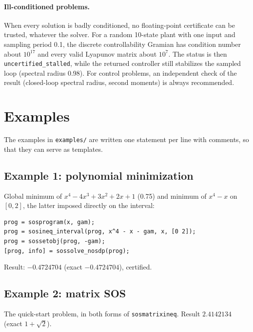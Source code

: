 \documentclass[11pt,a4paper]{article}
\newcommand{\code}[1]{\texttt{#1}}
\begin{document}
\paragraph{Ill-conditioned problems.} When every solution is badly conditioned, no floating-point certificate can be trusted, whatever the solver. For a random 10-state plant with one input and sampling period 0.1, the discrete controllability Gramian has condition number about $10^{17}$ and every valid Lyapunov matrix about $10^{7}$. The status is then \code{uncertified\_stalled}, while the returned controller still stabilizes the sampled loop (spectral radius 0.98). For control problems, an independent check of the result (closed-loop spectral radius, second moments) is always recommended.

\section{Examples}\label{sec:examples}
The examples in \code{examples/} are written one statement per line with comments, so that they can serve as templates.

\subsection{Example 1: polynomial minimization}
Global minimum of $x^4-4x^3+3x^2+2x+1$ (0.75) and minimum of $x^4-x$ on $[0,2]$, the latter imposed directly on the interval:
\begin{lstlisting}
prog = sosprogram(x, gam);
prog = sosineq_interval(prog, x^4 - x - gam, x, [0 2]);
prog = sossetobj(prog, -gam);
[prog, info] = sossolve_nosdp(prog);
\end{lstlisting}
Result: $-0.4724704$ (exact $-0.4724704$), certified.

\subsection{Example 2: matrix SOS}
The quick-start problem, in both forms of \code{sosmatrixineq}. Result $2.4142134$ (exact $1+\sqrt2$).
\end{document}

